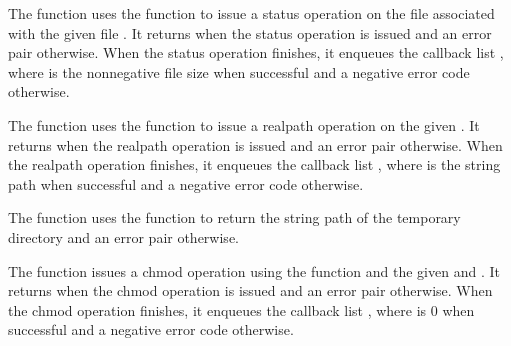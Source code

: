 The  function uses the 
function to issue a status operation on the file associated with the
given file . It returns  when the status operation
is issued and an error pair otherwise. When the status operation
finishes, it enqueues the callback list , where  is the nonnegative file size when
successful and a negative error code otherwise.

\begin{function}
\end{function}

The  function uses the
 function to issue a realpath operation on the
given . It returns  when the realpath operation is
issued and an error pair otherwise. When the realpath operation
finishes, it enqueues the callback list , where  is the string path when
successful and a negative error code otherwise.

\begin{function}
\end{function}

The  function uses the
 function to return the string path of the
temporary directory and an error pair otherwise.

\begin{function}
\end{function}

The  function issues a chmod operation using the
 function and the given  and
. It returns  when the chmod operation is issued
and an error pair otherwise. When the chmod operation finishes, it
enqueues the callback list , where
 is 0 when successful and a negative error code otherwise.

\begin{function}
\end{function}


